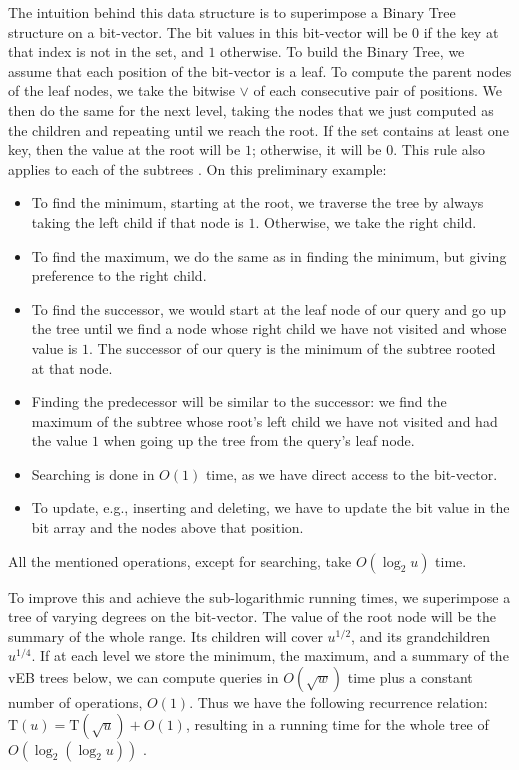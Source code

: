 The intuition behind this data structure is to superimpose a Binary Tree structure on a bit-vector.
The bit values in this bit-vector will be $0$ if the key at that index is not in the set, and $1$ otherwise.
To build the Binary Tree, we assume that each position of the bit-vector is a leaf.
To compute the parent nodes of the leaf nodes, we take the bitwise $\vee$ of each consecutive pair of positions.
We then do the same for the next level, taking the nodes that we just computed as the children and repeating until we reach the root.
If the set contains at least one key, then the value at the root will be $1$; otherwise, it will be $0$.
This rule also applies to each of the subtrees \cite{bille2020massive}.
On this preliminary example:
\begin{itemize}
    \item
    To find the minimum, starting at the root, we traverse the tree by always taking the left child if that node is $1$. Otherwise, we take the right child.
    
    \item
    To find the maximum, we do the same as in finding the minimum, but giving preference to the right child.
    
    \item
    To find the successor, we would start at the leaf node of our query and go up the tree until we find a node whose right child we have not visited and whose value is $1$. The successor of our query is the minimum of the subtree rooted at that node.
    
    \item
    Finding the predecessor will be similar to the successor: we find the maximum of the subtree whose root's left child we have not visited and had the value $1$ when going up the tree from the query's leaf node.
    
    \item
    Searching is done in $O(1)$ time, as we have direct access to the bit-vector.
    
    \item
    To update, e.g., inserting and deleting, we have to update the bit value in the bit array and the nodes above that position.
\end{itemize}

All the mentioned operations, except for searching, take $O(\log_2 u)$ time. 

To improve this and achieve the sub-logarithmic running times, we superimpose a tree of varying degrees on the bit-vector.
The value of the root node will be the summary of the whole range. Its children will cover $u^{1/2}$, and its grandchildren $u^{1/4}$.
If at each level we store the minimum, the maximum, and a summary of the vEB trees below, we can compute queries in $O(\sqrt{w})$ time plus a constant number of operations, $O(1)$.
Thus we have the following recurrence relation: $\text{T}(u) = \text{T}(\sqrt{u}) + O(1)$, resulting in a running time for the whole tree of $O(\log_2(\log_2 u))$ \cite{erikdemainelec11}.

